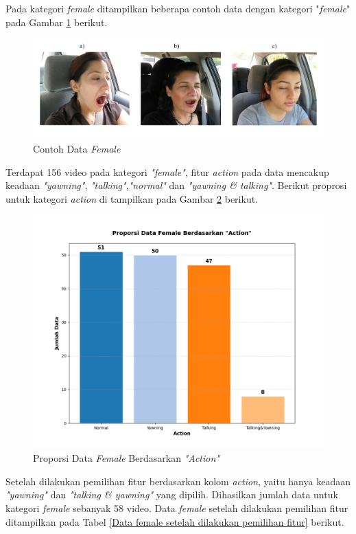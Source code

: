     
    Pada kategori \textit{female} ditampilkan beberapa contoh data dengan kategori "\textit{female}" pada Gambar \ref{Female Dataset} berikut.
    
     \begin{figure}[H]
         \centering
         \includegraphics[width=1.0\linewidth]{figures/bab4/female_contoh.png}
         \caption{Contoh Data \textit{Female}}
         \label{Female Dataset}
     \end{figure}

   

     Terdapat 156 video pada kategori \textit{"female"}, fitur \textit{action} pada data mencakup keadaan \textit{"yawning"}, \textit{"talking"},\textit{"normal"} dan \textit{"yawning \& talking"}. Berikut proprosi untuk kategori \textit{action} di tampilkan pada Gambar \ref{Proporsi Data Female Berdasarkan "Action"} berikut.

     \begin{figure}[H]
         \centering
         \includegraphics[width=0.75\linewidth]{figures/bab4/data_female.png}
         \caption{Proporsi Data \textit{Female }Berdasarkan \textit{"Action"}}
         \label{Proporsi Data Female Berdasarkan "Action"}
     \end{figure}

        Setelah dilakukan pemilihan fitur berdasarkan kolom 
        \textit{action}, yaitu hanya keadaan \textit{"yawning"} dan
         \textit{"talking \& yawning"} yang dipilih. Dihasilkan 
         jumlah data untuk kategori \textit{female} sebanyak 58 video. 
         Data \textit{female} setelah dilakukan pemilihan fitur 
         ditampilkan pada Tabel \ref{Data female setelah dilakukan pemilihan fitur} berikut.

